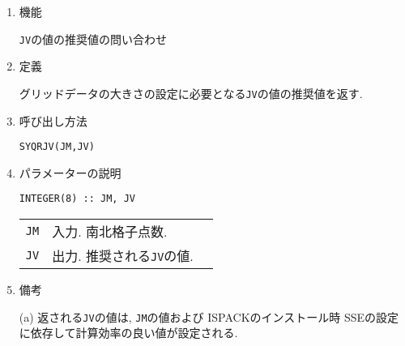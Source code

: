 \documentclass[a4j]{jsarticle}
\begin{document}
\begin{enumerate}

\item 機能

\texttt{JV}の値の推奨値の問い合わせ  

\item 定義

グリッドデータの大きさの設定に必要となる\texttt{JV}の値の推奨値を返す.

\item 呼び出し方法 
    
\texttt{SYQRJV(JM,JV)}
  
\item パラメーターの説明

\begin{verbatim}
INTEGER(8) :: JM, JV
\end{verbatim}    

\begin{tabular}{lll}
\texttt{JM} & 入力. 南北格子点数.\\  
\texttt{JV} & 出力. 推奨される\texttt{JV}の値.
\end{tabular}

\item 備考

(a) 返される\texttt{JV}の値は, \texttt{JM}の値および
ISPACKのインストール時 SSEの設定に依存して計算効率の良い値が設定される.

\end{enumerate}
\end{document}
